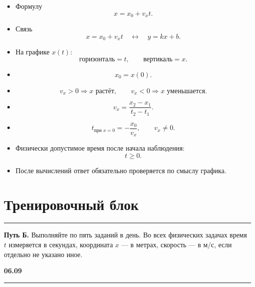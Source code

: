 \documentclass[a4paper,12pt]{article}
\newcommand{\sectionline}{%
  \par\noindent\color{accent}\rule{\linewidth}{0.5pt}\color{textgray}\par
}
\newcommand{\checkitem}{\(\square\)\ }
\newcommand{\daytitle}[1]{%
  \vspace{0.7em}
  {\large\bfseries\color{darkaccent}#1}\par
  \vspace{0.2em}
  \noindent\color{accent}\rule{\linewidth}{0.4pt}\color{textgray}
  \vspace{0.3em}
}
\begin{document}
\begin{itemize}[leftmargin=*,itemsep=0.5em]
    \item[\checkitem] Формулу
    \[
    x=x_0+v_xt.
    \]

    \item[\checkitem] Связь
    \[
    x=x_0+v_xt
    \quad\longleftrightarrow\quad
    y=kx+b.
    \]

    \item[\checkitem] На графике \(x(t)\):
    \[
    \text{горизонталь}=t,\qquad
    \text{вертикаль}=x.
    \]

    \item[\checkitem]
    \[
    x_0=x(0).
    \]

    \item[\checkitem]
    \[
    v_x>0 \Rightarrow x \text{ растёт},
    \qquad
    v_x<0 \Rightarrow x \text{ уменьшается}.
    \]

    \item[\checkitem]
    \[
    v_x=\frac{x_2-x_1}{t_2-t_1}.
    \]

    \item[\checkitem]
    \[
    t_{\text{при }x=0}=-\frac{x_0}{v_x},
    \qquad v_x\neq0.
    \]

    \item[\checkitem]
    Физически допустимое время после начала наблюдения:
    \[
    t\ge0.
    \]

    \item[\checkitem]
    После вычислений ответ обязательно проверяется по смыслу графика.
\end{itemize}


\clearpage

\section{\color{darkaccent}Тренировочный блок}
\sectionline

\textbf{Путь Б.} Выполняйте по пять заданий в день.
Во всех физических задачах время \(t\) измеряется в секундах,
координата \(x\) --- в метрах, скорость --- в \(\text{м/с}\),
если отдельно не указано иное.


\daytitle{06.09}
\end{document}

